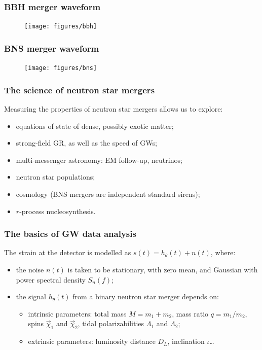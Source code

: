 \documentclass{beamer}
\begin{document}
\begin{frame}
    \frametitle{BBH merger waveform}
    \begin{figure}[ht]
    \centering
    \texttt{[image: figures/bbh]}
    \label{fig:bbh}
    \end{figure}
\end{frame}

\begin{frame}
    \frametitle{BNS merger waveform}
    \begin{figure}[ht]
    \centering
    \texttt{[image: figures/bns]}
    \label{fig:bns}
    \end{figure}
\end{frame}

\begin{frame}
    \frametitle{The science of neutron star mergers}
    Measuring the properties of neutron star mergers allows us to explore:
    \begin{itemize}
        \item equations of state of dense, possibly exotic matter;
        \item strong-field GR, as well as the speed of GWs;
        \item multi-messenger astronomy: EM follow-up, neutrinos;
        \item neutron star populations;
        \item cosmology (BNS mergers are independent standard sirens);
        \item \(r\)-process nucleosynthesis. 
    \end{itemize}
\end{frame}

\begin{frame}
    \frametitle{The basics of GW data analysis}
    The strain at the detector is modelled as \(s(t) = h_\theta (t) + n(t)\), where:
    \begin{itemize}
        \item the noise \(n(t)\) is taken to be stationary, with zero mean, and Gaussian with power spectral density \(S_n(f)\);
        \item the signal \(h_\theta (t)\) from a binary neutron star merger depends on: 
        \begin{itemize}
            \item intrinsic parameters: total mass \(M = m_1 + m_2 \), mass ratio \(q = m_1 / m_2 \), spins \(\vec{\chi}_{1}\) and \(\vec{\chi}_2\), tidal polarizabilities \(\Lambda_1\) and \(\Lambda_2 \);
            \item extrinsic parameters: luminosity distance \(D_L\), inclination \(\iota \)\dots
        \end{itemize}
    \end{itemize}
\end{frame}
\end{document}
